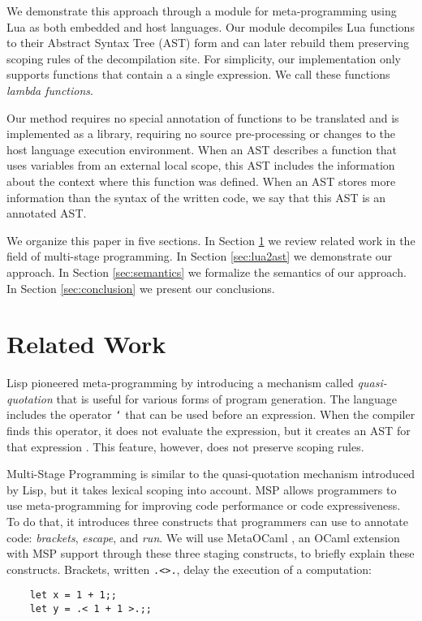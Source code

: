 \documentclass[english]{llncs}
\begin{document}
We demonstrate this approach through a module for meta-programming using Lua
as both embedded and host languages.
Our module decompiles Lua functions to their Abstract Syntax Tree (AST) form
and can later rebuild them preserving scoping rules of the decompilation site.
For simplicity, our implementation only supports functions that contain a
a single expression.
We call these functions \emph{lambda functions}.

Our method requires no special annotation of functions to be translated and is
implemented as a library, requiring no source pre-processing or changes to
the host language execution environment.
When an AST describes a function that uses variables from an
external local scope, this AST includes the information about the context
where this function was defined.
When an AST stores more information than the syntax of the written code,
we say that this AST is an annotated AST.

We organize this paper in five sections.
In Section \ref{sec:related} we review related work in the field
of multi-stage programming.
In Section \ref{sec:lua2ast} we demonstrate our approach.
In Section \ref{sec:semantics} we formalize the semantics of our approach.
In Section \ref{sec:conclusion} we present our conclusions.

\section{Related Work}
\label{sec:related}

Lisp \cite{McCarthy1960RFS} pioneered meta-programming by introducing
a mechanism called \emph{quasi-quotation}
that is useful for various forms of program generation.
The language includes the operator \texttt{`} that can be used before an expression.
When the compiler finds this operator, it does not evaluate the expression,
but it creates an AST for that expression \cite{Bawden1999quasiquotation}.
This feature, however, does not preserve scoping rules.

Multi-Stage Programming \cite{Taha1999MSP,Taha2004gentle,Taha2008gentle} is
similar to the quasi-quotation mechanism introduced by Lisp,
but it takes lexical scoping into account.
MSP allows programmers to use meta-programming for improving code performance
or code expressiveness.
To do that, it introduces three constructs that programmers can use to
annotate code: \emph{brackets}, \emph{escape}, and \emph{run}.
We will use MetaOCaml \cite{Calcagno2003implementing}, an OCaml extension
with MSP support through these three staging constructs, to briefly explain
these constructs.
%
Brackets, written \texttt{.<>.}, delay the execution of a computation:
\begin{verbatim}
    let x = 1 + 1;;
    let y = .< 1 + 1 >.;;
\end{verbatim}
\end{document}
